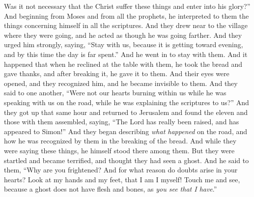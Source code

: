 \begin{biblechapter}
\verse Was it not necessary that the Christ suffer these things and enter into his glory?”
\verse And beginning from Moses and from all the prophets, he interpreted to them the things concerning himself in all the scriptures.
\verse And they drew near to the village where they were going, and he acted as though he was going farther.
\verse And they urged him strongly, saying, “Stay with us, because it is getting toward evening, and by this time the day is far spent.” And he went in to stay with them.
\verse And it happened that when he reclined at the table with them, he took the bread and gave thanks, and after breaking it, he gave it to them.
\verse And their eyes were opened, and they recognized him, and he became invisible to them.
\verse And they said to one another, “Were not our hearts burning within us while he was speaking with us on the road, while he was explaining the scriptures to us?”
\verse And they got up that same hour and returned to Jerusalem and found the eleven and those with them assembled,
\verse saying, “The Lord has really been raised, and has appeared to Simon!”
\verse And they began describing \textit{what happened} on the road, and how he was recognized by them in the breaking of the bread.
 And while they were saying these things, he himself stood there among them.
\verse But they were startled and became terrified, and thought they had seen a ghost.
\verse And he said to them, “Why are you frightened? And for what reason do doubts arise in your hearts?
\verse Look at my hands and my feet, that I am I myself! Touch me and see, because a ghost does not have flesh and bones, as \textit{you see that I have}.”

\end{biblechapter}

